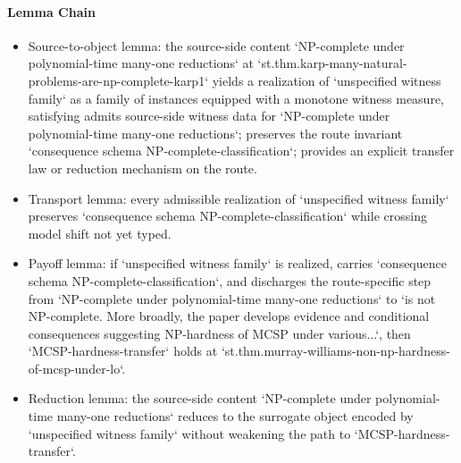 \documentclass[11pt]{article}
\begin{document}
\paragraph{Lemma Chain}
\begin{itemize}
\item Source-to-object lemma: the source-side content `NP-complete under polynomial-time many-one reductions` at `st.thm.karp-many-natural-problems-are-np-complete-karp1` yields a realization of `unspecified witness family` as a family of instances equipped with a monotone witness measure, satisfying admits source-side witness data for `NP-complete under polynomial-time many-one reductions`; preserves the route invariant `consequence schema NP-complete-classification`; provides an explicit transfer law or reduction mechanism on the route.
\item Transport lemma: every admissible realization of `unspecified witness family` preserves `consequence schema NP-complete-classification` while crossing model shift not yet typed.
\item Payoff lemma: if `unspecified witness family` is realized, carries `consequence schema NP-complete-classification`, and discharges the route-specific step from `NP-complete under polynomial-time many-one reductions` to `is not NP-complete. More broadly, the paper develops evidence and conditional consequences suggesting NP-hardness of MCSP under various...`, then `MCSP-hardness-transfer` holds at `st.thm.murray-williams-non-np-hardness-of-mcsp-under-lo`.
\item Reduction lemma: the source-side content `NP-complete under polynomial-time many-one reductions` reduces to the surrogate object encoded by `unspecified witness family` without weakening the path to `MCSP-hardness-transfer`.
\end{itemize}
\end{document}
